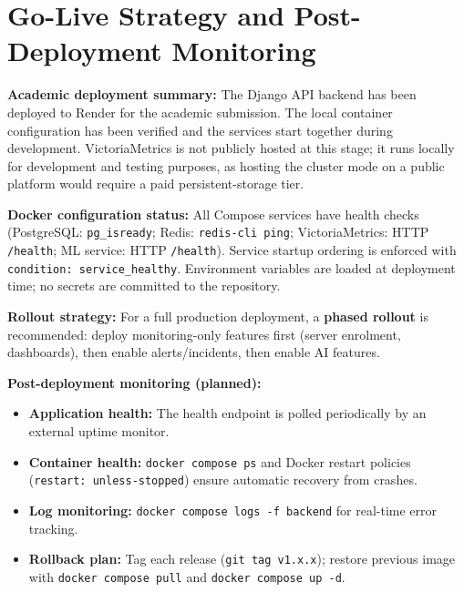 \section{Go-Live Strategy and Post-Deployment Monitoring}

\textbf{Academic deployment summary:} The Django API backend has been deployed
to Render for the academic submission.  The local container configuration has
been verified and the services start together during development.  VictoriaMetrics is not publicly hosted
at this stage; it runs locally for development and testing purposes, as hosting
the cluster mode on a public platform would require a paid persistent-storage tier.

\textbf{Docker configuration status:} All Compose services have health checks
(PostgreSQL: \texttt{pg\_isready}; Redis: \texttt{redis-cli ping};
VictoriaMetrics: HTTP \texttt{/health}; ML service: HTTP \texttt{/health}).
Service startup ordering is enforced with \texttt{condition: service\_healthy}.
Environment variables are loaded at deployment time; no secrets are
committed to the repository.

\textbf{Rollout strategy:} For a full production deployment, a \textbf{phased
rollout} is recommended: deploy monitoring-only features first (server
enrolment, dashboards), then enable alerts/incidents, then enable AI features.

\textbf{Post-deployment monitoring (planned):}
\begin{itemize}
  \item \textbf{Application health:} The health endpoint is polled
        periodically by an external uptime monitor.
  \item \textbf{Container health:} \texttt{docker compose ps} and Docker
        restart policies (\texttt{restart: unless-stopped}) ensure automatic
        recovery from crashes.
  \item \textbf{Log monitoring:} \texttt{docker compose logs -f backend}
        for real-time error tracking.
  \item \textbf{Rollback plan:} Tag each release (\texttt{git tag v1.x.x});
        restore previous image with \texttt{docker compose pull} and
        \texttt{docker compose up -d}.
\end{itemize}


